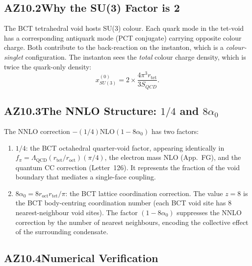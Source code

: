 \documentclass[aps,prl,twocolumn,showpacs,preprintnumbers]{revtex4-2}
\newcommand{\roct}{r_{\mathrm{oct}}}
\newcommand{\rtet}{r_{\mathrm{tet}}}
\newcommand{\azero}{\alpha_0}
\newcommand{\LQCD}{\Lambda_{\mathrm{QCD}}}
\newcommand{\NLO}{\mathrm{NLO}}
\begin{document}
\subsection*{AZ10.2\quad Why the SU(3) Factor is 2}

The BCT tetrahedral void hosts SU(3) colour. Each quark mode in the
tet-void has a corresponding antiquark mode (PCT conjugate) carrying
opposite colour charge. Both contribute to the back-reaction on the
instanton, which is a \emph{colour-singlet} configuration.
The instanton sees the \emph{total} colour charge density, which is
twice the quark-only density:
\begin{equation}
  x_{SU(3)}^{(0)} = 2 \times \frac{4\pi^3\rtet}{3S_{QCD}}.
\end{equation}

\subsection*{AZ10.3\quad The NNLO Structure: $1/4$ and $8\azero$}

The NNLO correction $-(1/4)\NLO(1-8\azero)$ has two factors:
\begin{enumerate}
  \item $1/4$: the BCT octahedral quarter-void factor, appearing
    identically in $f_\pi = \LQCD(\rtet/\roct)(\pi/4)$,
    the electron mass NLO (App.~FG), and the quantum CC correction
    (Letter~126). It represents the fraction of the void boundary
    that mediates a single-face coupling.
  \item $8\azero = 8\roct\rtet/\pi$: the BCT lattice coordination
    correction. The value $z=8$ is the BCT body-centring coordination
    number (each BCT void site has 8 nearest-neighbour void sites).
    The factor $(1-8\azero)$ suppresses the NNLO correction by the
    number of nearest neighbours, encoding the collective effect
    of the surrounding condensate.
\end{enumerate}

\subsection*{AZ10.4\quad Numerical Verification}
\end{document}
